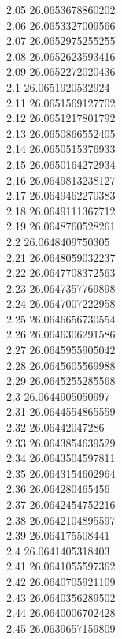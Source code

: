 {2.05	26.0653678860202\\
2.06	26.0653327009566\\
2.07	26.0652975255255\\
2.08	26.0652623593416\\
2.09	26.0652272020436\\
2.1	26.0651920532924\\
2.11	26.0651569127702\\
2.12	26.0651217801792\\
2.13	26.0650866552405\\
2.14	26.0650515376933\\
2.15	26.0650164272934\\
2.16	26.0649813238127\\
2.17	26.0649462270383\\
2.18	26.0649111367712\\
2.19	26.0648760528261\\
2.2	26.0648409750305\\
2.21	26.0648059032237\\
2.22	26.0647708372563\\
2.23	26.0647357769898\\
2.24	26.0647007222958\\
2.25	26.0646656730554\\
2.26	26.0646306291586\\
2.27	26.0645955905042\\
2.28	26.0645605569988\\
2.29	26.0645255285568\\
2.3	26.0644905050997\\
2.31	26.0644554865559\\
2.32	26.06442047286\\
2.33	26.0643854639529\\
2.34	26.0643504597811\\
2.35	26.0643154602964\\
2.36	26.064280465456\\
2.37	26.0642454752216\\
2.38	26.0642104895597\\
2.39	26.064175508441\\
2.4	26.0641405318403\\
2.41	26.0641055597362\\
2.42	26.0640705921109\\
2.43	26.0640356289502\\
2.44	26.0640006702428\\
2.45	26.0639657159809\\
}
